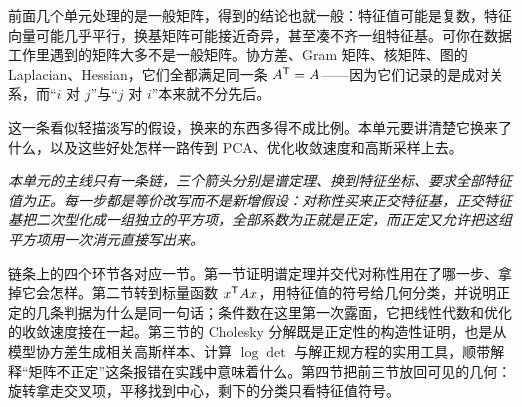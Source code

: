 前面几个单元处理的是一般矩阵，得到的结论也就一般：特征值可能是复数，特征向量可能几乎平行，换基矩阵可能接近奇异，甚至凑不齐一组特征基。可你在数据工作里遇到的矩阵大多不是一般矩阵。协方差、Gram 矩阵、核矩阵、图的 Laplacian、Hessian，它们全都满足同一条 \(A^{\mathsf{T}}=A\)——因为它们记录的是成对关系，而``\(i\) 对 \(j\)''与``\(j\) 对 \(i\)''本来就不分先后。

这一条看似轻描淡写的假设，换来的东西多得不成比例。本单元要讲清楚它换来了什么，以及这些好处怎样一路传到 PCA、优化收敛速度和高斯采样上去。

\begin{center}

\emph{本单元的主线只有一条链，三个箭头分别是谱定理、换到特征坐标、要求全部特征值为正。每一步都是等价改写而不是新增假设：对称性买来正交特征基，正交特征基把二次型化成一组独立的平方项，全部系数为正就是正定，而正定又允许把这组平方项用一次消元直接写出来。}
\end{center}

链条上的四个环节各对应一节。第一节证明谱定理并交代对称性用在了哪一步、拿掉它会怎样。第二节转到标量函数 \(x^{\mathsf{T}}Ax\)，用特征值的符号给几何分类，并说明正定的几条判据为什么是同一句话；条件数在这里第一次露面，它把线性代数和优化的收敛速度接在一起。第三节的 Cholesky 分解既是正定性的构造性证明，也是从模型协方差生成相关高斯样本、计算 \(\log\det\) 与解正规方程的实用工具，顺带解释``矩阵不正定''这条报错在实践中意味着什么。第四节把前三节放回可见的几何：旋转拿走交叉项，平移找到中心，剩下的分类只看特征值符号。

